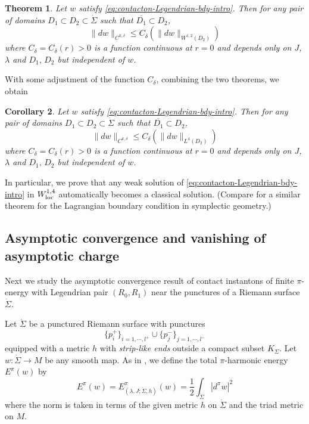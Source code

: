 \documentclass[reqno]{amsart}
\newcommand{\be}{\begin{equation}}
\newcommand{\ee}{\end{equation}}
\theoremstyle{theorem}
\newtheorem{thm}{Theorem}[section]
\newtheorem{cor}[thm]{Corollary}
\theoremstyle{definition}
\numberwithin{equation}{section}
\begin{document}
\begin{thm}\label{thm:local-regularity-intro} Let $w$ satisfy \eqref{eq:contacton-Legendrian-bdy-intro}.
Then for any pair of domains $D_1 \subset D_2 \subset \dot \Sigma$ such that $\overline{D_1}\subset D_2$,
$$
\|dw\|_{C^{k,\delta}} \leq C_\delta(\|dw\|_{W^{1,2}(D_2)})
$$
where $C_\delta = C_\delta(r) > 0$ is a function continuous at $r = 0$
and depends only on $J$, $\lambda$ and $D_1, \, D_2$ but independent of $w$.
\end{thm}

With some adjustment of the function $C_\delta$, combining the two theorems, we obtain
\begin{cor} Let $w$ satisfy \eqref{eq:contacton-Legendrian-bdy-intro}.
Then for any pair of domains $D_1 \subset D_2 \subset \dot \Sigma$ such that $\overline{D_1}\subset D_2$,
$$
\|dw\|_{C^{k,\delta}} \leq C_\delta(\|dw\|_{L^4(D_2)})
$$
where $C_\delta = C_\delta(r) > 0$ is a function continuous at $r = 0$
and depends only on $J$, $\lambda$ and $D_1, \, D_2$ but independent of $w$.
\end{cor}
In particular, we prove that
any weak solution of \eqref{eq:contacton-Legendrian-bdy-intro} in
$W^{1,4}_{\text{\rm loc}}$ automatically becomes a classical solution.
(Compare \cite[Theorem 8.5.5]{oh:book1} for a similar theorem for the
Lagrangian boundary condition in symplectic geometry.)

\subsection{Asymptotic convergence and vanishing of asymptotic charge}

Next we study the asymptotic convergence result of contact instantons
of finite $\pi$-energy with Legendrian pair $(R_0,R_1)$ near the punctures of
a Riemann surface $\dot \Sigma$.

Let $\dot\Sigma$ be a punctured Riemann surface with punctures
$$
\{p^+_i\}_{i=1, \cdots, l^+}\cup \{p^-_j\}_{j=1, \cdots, l^-}
$$
equipped with a metric $h$ with \emph{strip-like ends} outside a compact subset $K_\Sigma$.
Let $w: \dot \Sigma \to M$ be any smooth map. As in \cite{oh-wang:CR-map1}, we define the total $\pi$-harmonic energy $E^\pi(w)$
by
\be\label{eq:endenergy}
E^\pi(w) = E^\pi_{(\lambda,J;\dot\Sigma,h)}(w) = \frac{1}{2} \int_{\dot \Sigma} |d^\pi w|^2
\ee
where the norm is taken in terms of the given metric $h$ on $\dot \Sigma$ and the triad metric on $M$.
\end{document}
